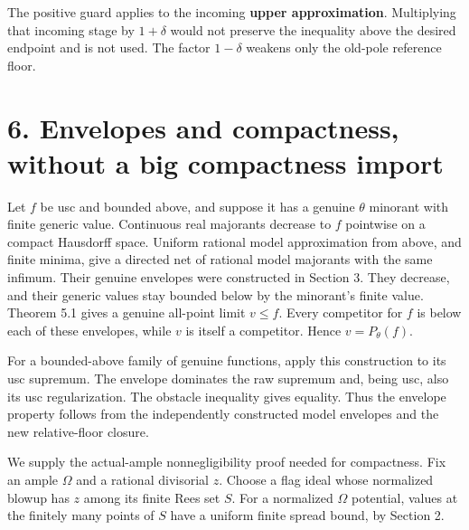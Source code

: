 \documentclass[
  10pt,
]{article}
\begin{document}
The positive guard applies to the incoming \textbf{upper approximation}.
Multiplying that incoming stage by \(1+\delta\) would not preserve the
inequality above the desired endpoint and is not used. The factor
\(1-\delta\) weakens only the old-pole reference floor.

\section{6. Envelopes and compactness, without a big compactness
import}\label{envelopes-and-compactness-without-a-big-compactness-import}

Let \(f\) be usc and bounded above, and suppose it has a genuine
\(\theta\) minorant with finite generic value. Continuous real majorants
decrease to \(f\) pointwise on a compact Hausdorff space. Uniform
rational model approximation from above, and finite minima, give a
directed net of rational model majorants with the same infimum. Their
genuine envelopes were constructed in Section 3. They decrease, and
their generic values stay bounded below by the minorant's finite value.
Theorem 5.1 gives a genuine all-point limit \(v\leq f\). Every
competitor for \(f\) is below each of these envelopes, while \(v\) is
itself a competitor. Hence \(v=P_\theta(f)\).

For a bounded-above family of genuine functions, apply this construction
to its usc supremum. The envelope dominates the raw supremum and, being
usc, also its usc regularization. The obstacle inequality gives
equality. Thus the envelope property follows from the independently
constructed model envelopes and the new relative-floor closure.

We supply the actual-ample nonnegligibility proof needed for
compactness. Fix an ample \(\Omega\) and a rational divisorial \(z\).
Choose a flag ideal whose normalized blowup has \(z\) among its finite
Rees set \(S\). For a normalized \(\Omega\) potential, values at the
finitely many points of \(S\) have a uniform finite spread bound, by
Section 2.
\end{document}
